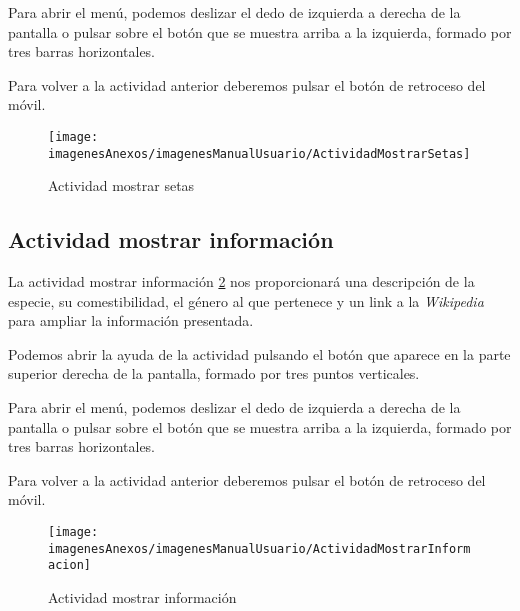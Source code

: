 Para abrir el menú, podemos deslizar el dedo de izquierda a derecha de la pantalla o pulsar sobre el botón que se muestra arriba a la izquierda, formado por tres barras horizontales.

Para volver a la actividad anterior deberemos pulsar el botón de retroceso del móvil.

\begin{figure}[h]
    \begin{center}%
        \begin{center}%
          \texttt{[image: imagenesAnexos/imagenesManualUsuario/ActividadMostrarSetas]}%
          \caption{Actividad mostrar setas}%
          \label{figActividadMostrarSetas}%
        \end{center}%
  	\end{center}%
\end{figure}%
\newpage

\subsection{Actividad mostrar información}

La actividad mostrar información \ref{figActividadMostrarInformacion} nos proporcionará una descripción de la especie, su comestibilidad, el género al que pertenece y un link a la \textit{Wikipedia} para ampliar la información presentada.

Podemos abrir la ayuda de la actividad pulsando el botón que aparece en la parte superior derecha de la pantalla, formado por tres puntos verticales.

Para abrir el menú, podemos deslizar el dedo de izquierda a derecha de la pantalla o pulsar sobre el botón que se muestra arriba a la izquierda, formado por tres barras horizontales.

Para volver a la actividad anterior deberemos pulsar el botón de retroceso del móvil.

\begin{figure}[h]
    \begin{center}%
        \begin{center}%
          \texttt{[image: imagenesAnexos/imagenesManualUsuario/ActividadMostrarInformacion]}%
          \caption{Actividad mostrar información}%
          \label{figActividadMostrarInformacion}%
        \end{center}%
  	\end{center}%
\end{figure}%
\newpage

